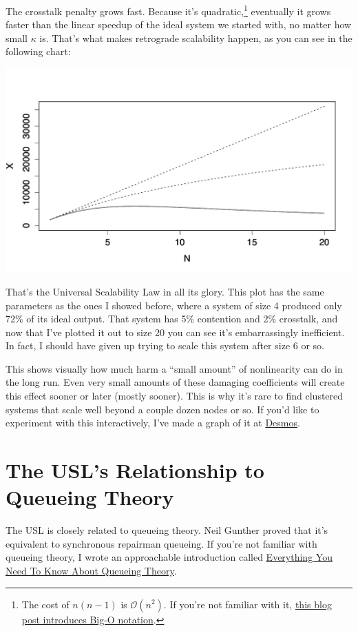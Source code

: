 \documentclass{vivid_layout}
\begin{document}
The crosstalk penalty grows fast. Because it's quadratic,\footnote{The cost of
$n(n-1)$ is $\mathcal{O}(n^2)$. If you're not familiar with it,
\href{https://www.vividcortex.com/blog/2013/10/23/big-o-notation-made-simple/}{this
blog post introduces Big-O notation}.} eventually it grows faster than the
linear speedup of the ideal system we started with, no matter how small $\kappa$
is. That's what makes retrograde scalability happen, as you can see in the
following chart:
\begin{center}
\includegraphics[width=.85\linewidth]{scalability/usl}
\end{center}

That's the Universal Scalability Law in all its glory.  This plot has the same
parameters as the ones I showed before, where a system of size 4 produced only
72\% of its ideal output. That system has 5\% contention and 2\% crosstalk,
and now that I've plotted it out to size 20 you can see it's embarrassingly
inefficient.  In fact, I should have given up trying to scale this system after
size 6 or so.

This shows visually how much harm a ``small amount'' of nonlinearity can do in
the long run.  Even very small amounts of these damaging coefficients will
create this effect sooner or later (mostly sooner). This is why it's rare to
find clustered systems that scale well beyond a couple dozen nodes or so.
If you'd like to experiment with this interactively, I've made a graph of it at
\href{https://www.desmos.com/calculator/2l0jcjmsxn}{Desmos}.

\section{The USL's Relationship to Queueing Theory}

The USL is closely related to queueing theory. Neil Gunther proved that it's
equivalent to synchronous repairman queueing. If you're not familiar with
queueing theory, I wrote an approachable introduction called
\href{https://www.vividcortex.com/resources/queueing-theory/}{Everything You
Need To Know About Queueing Theory}.
\end{document}
